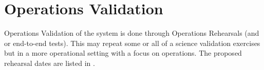 
\section{Operations Validation}
 Operations Validation of the system is done through Operations Rehearsals (and or end-to-end tests).
 This may repeat some or all of a science validation exercises but in a more operational setting with a focus on operations. The proposed rehearsal dates are listed in .


